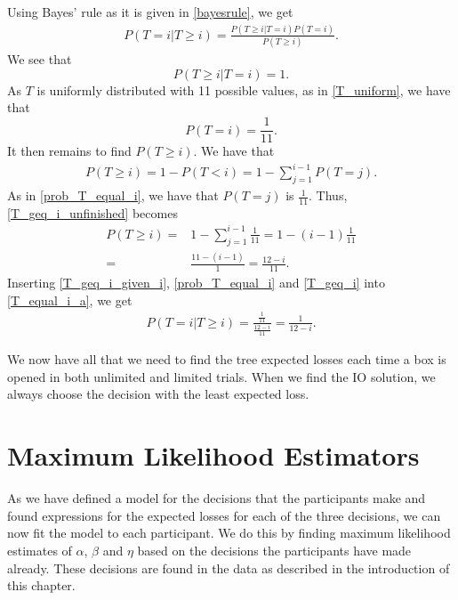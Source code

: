 Using Bayes' rule as it is given in \eqref{bayesrule}, we get
\begin{equation}
\label{T_equal_i_a}
    \begin{aligned}
        P(T=i|T\geq i) = \frac{P(T\geq i|T=i)P(T=i)}{P(T\geq i)}.
    \end{aligned}
\end{equation}
We see that 
\begin{equation}
\label{T_geq_i_given_i}
    P(T\geq i|T=i) = 1.
\end{equation}
As $T$ is uniformly distributed with 11 possible values, as in \eqref{T_uniform}, we have that
\begin{equation}
\label{prob_T_equal_i}
    P(T=i) = \frac{1}{11}.
\end{equation}
It then remains to find $P(T\geq i)$. We have that
\begin{equation}
\label{T_geq_i_unfinished}
    \begin{aligned}
        P(T\geq i) = 1 - P(T<i) = 1 - \sum_{j=1}^{i-1}P(T=j).
    \end{aligned}
\end{equation}
As in \eqref{prob_T_equal_i}, we have that $P(T=j)$ is $\frac{1}{11}$. Thus, \eqref{T_geq_i_unfinished} becomes
\begin{equation}
\label{T_geq_i}
    \begin{aligned}
        P(T\geq i) =& 1-\sum_{j=1}^{i-1} \frac{1}{11} = 1- (i-1)\frac{1}{11}\\[6pt]
        =& \frac{11-(i-1)}{1} = \frac{12-i}{11}.
    \end{aligned}
\end{equation}
Inserting \eqref{T_geq_i_given_i}, \eqref{prob_T_equal_i} and \eqref{T_geq_i} into \eqref{T_equal_i_a}, we get 
\begin{equation}
    \begin{aligned}
        P(T=i|T\geq i) = \frac{\frac{1}{11}}{\frac{12-i}{11}} = \frac{1}{12-i}.
    \end{aligned}
\end{equation}

We now have all that we need to find the tree expected losses each time a box is opened in both unlimited and limited trials. When we find the IO solution, we always choose the decision with the least expected loss. 





\section{Maximum Likelihood Estimators}
As we have defined a model for the decisions that the participants make and found expressions for the expected losses for each of the three decisions, we can now fit the model to each participant. We do this by finding maximum likelihood estimates of $\alpha$, $\beta$ and $\eta$ based on the decisions the participants have made already. These decisions are found in the data as described in the introduction of this chapter. 

